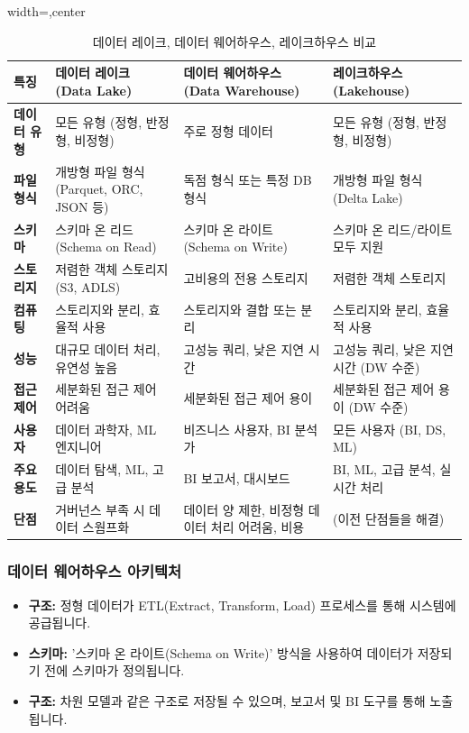 \documentclass[11pt,a4paper]{article}
\theoremstyle{definition}
\begin{document}
\begin{table}[h!]
\centering
\caption{데이터 레이크, 데이터 웨어하우스, 레이크하우스 비교}
\label{tab:data_storage_comparison}
\begin{adjustbox}{width=\textwidth,center}
\begin{tabular}{p{}p{}p{}p{}}
\toprule
\textbf{특징} & \textbf{데이터 레이크 (Data Lake)} & \textbf{데이터 웨어하우스 (Data Warehouse)} & \textbf{레이크하우스 (Lakehouse)} \\
\midrule
\textbf{데이터 유형} & 모든 유형 (정형, 반정형, 비정형) & 주로 정형 데이터 & 모든 유형 (정형, 반정형, 비정형) \\
\textbf{파일 형식} & 개방형 파일 형식 (Parquet, ORC, JSON 등) & 독점 형식 또는 특정 DB 형식 & 개방형 파일 형식 (Delta Lake) \\
\textbf{스키마} & 스키마 온 리드 (Schema on Read) & 스키마 온 라이트 (Schema on Write) & 스키마 온 리드/라이트 모두 지원 \\
\textbf{스토리지} & 저렴한 객체 스토리지 (S3, ADLS) & 고비용의 전용 스토리지 & 저렴한 객체 스토리지 \\
\textbf{컴퓨팅} & 스토리지와 분리, 효율적 사용 & 스토리지와 결합 또는 분리 & 스토리지와 분리, 효율적 사용 \\
\textbf{성능} & 대규모 데이터 처리, 유연성 높음 & 고성능 쿼리, 낮은 지연 시간 & 고성능 쿼리, 낮은 지연 시간 (DW 수준) \\
\textbf{접근 제어} & 세분화된 접근 제어 어려움 & 세분화된 접근 제어 용이 & 세분화된 접근 제어 용이 (DW 수준) \\
\textbf{사용자} & 데이터 과학자, ML 엔지니어 & 비즈니스 사용자, BI 분석가 & 모든 사용자 (BI, DS, ML) \\
\textbf{주요 용도} & 데이터 탐색, ML, 고급 분석 & BI 보고서, 대시보드 & BI, ML, 고급 분석, 실시간 처리 \\
\textbf{단점} & 거버넌스 부족 시 데이터 스웜프화 & 데이터 양 제한, 비정형 데이터 처리 어려움, 비용 & (이전 단점들을 해결) \\
\bottomrule
\end{tabular}
\end{adjustbox}
\end{table}

\subsubsection{데이터 웨어하우스 아키텍처}
\begin{itemize}
    \item \textbf{구조:} 정형 데이터가 ETL(Extract, Transform, Load) 프로세스를 통해 시스템에 공급됩니다.
    \item \textbf{스키마:} '스키마 온 라이트(Schema on Write)' 방식을 사용하여 데이터가 저장되기 전에 스키마가 정의됩니다.
    \item \textbf{구조:} 차원 모델과 같은 구조로 저장될 수 있으며, 보고서 및 BI 도구를 통해 노출됩니다.
\end{itemize}
\end{document}
